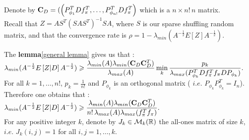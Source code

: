 Denote by $\bold{C}_{D} = (\left(P_{\phi_{1}}^{T} D f_{\pi}^{T},\dots,P_{\phi_{n!}}^{T} D f_{\pi}^{T} \right) $ which is a $ n \times n! \,n$ matrix.\\


Recall that $Z = A S^{T} (S A S^{T})^{-1} S A$, where $S$ is our sparse shuffling random matrix, and that the convergence rate is  $\rho = 1 - \lambda_{min}(A^{-\frac12}E[Z]A^{-\frac12}  )$.\\

\pr

The \textbf{lemma}\ref{general lemma} gives us that :\\ 
$\displaystyle \lambda_{min}(A^{-\frac12}E\left[Z|D\right]A^{-\frac12} ) \geqslant \displaystyle  \frac{\lambda_{min}(A) \lambda_{min}(\bold{C}_{D} \bold{C}_{D}^{T})}{ \lambda_{max}(A)} \min_{k} \frac{p_{k}}{\lambda_{max}( P_{\phi_{k}}^{T} D f_{\pi}^{T} f_{\pi} D P_{\phi_{k}} )}.$\\
For all $k = 1,\dots,n!$, $p_{k} = \frac{1}{n!}$ and $P_{\phi_{k}}$ is an orthogonal matrix ( $i.e.$ $P_{\phi_{k}} P_{\phi_{k}}^{T} = I_{n}$). Therefore one obtains that :\\

$\displaystyle \lambda_{min}(A^{-\frac12}E\left[Z|D\right]A^{-\frac12} ) \geqslant \displaystyle  \frac{\lambda_{min}(A) \lambda_{min}(\bold{C}_{D} \bold{C}_{D}^{T})}{ n! \, \lambda_{max}(A) \lambda_{max}(f_{\pi}^{T} f_{\pi})}. $\\
 
 For any positive integer $k$, denote by $J_{k} \in {\mathcal M}_{k}({\mathbb R})$ the all-ones matrix of size $k$, $i.e.$ $J_{k}(i,j) = 1$ for all $i,j = 1,\dots, k$.\\
 
